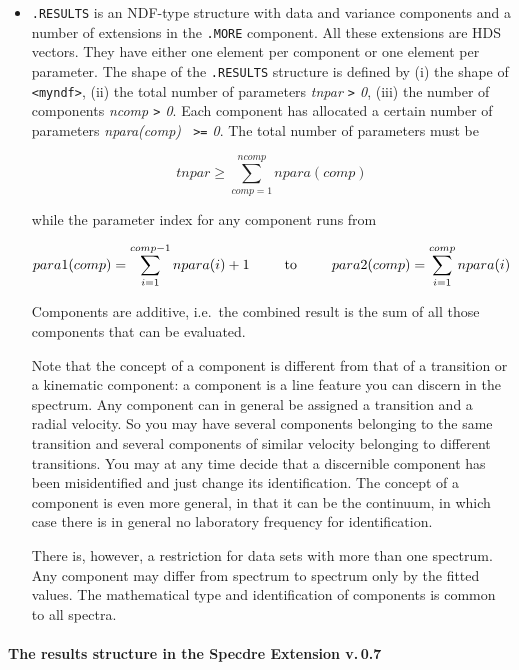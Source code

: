 \begin{itemize}
\item{\tt .RESULTS} is an NDF-type structure with data and variance
   components and a number of extensions in the {\tt .MORE}
   component. All these extensions are HDS vectors. They have either one
   element per component or one element per parameter. The shape of the
   {\tt .RESULTS} structure is defined by (i) the shape of {\tt
   <myndf>}, (ii) the total number of parameters {\it tnpar {\tt>} 0},
   (iii) the number of components {\it ncomp {\tt>} 0}. Each component
   has allocated a certain number of parameters {\it npara(comp) {\tt
   >=} 0}. The total number of parameters must be

   \[tnpar\geq\sum_{comp=1}^{ncomp}npara(comp)\]

   while the parameter index for any component runs from

   \[para1(comp)=\sum_{i=1}^{comp-1}npara(i)+1
   \mbox{\phantom{mmm}to\phantom{mmm}}
   para2(comp)=\sum_{i=1}^{comp}npara(i)\]

   Components are additive, i.e.\ the combined result is the sum of all
   those components that can be evaluated.

   Note that the concept of a component is different from that of a
   transition or a kinematic component: a component is a line feature
   you can discern in the spectrum. Any component can in general be
   assigned a transition and a radial velocity. So you may have several
   components belonging to the same transition and several components of
   similar velocity belonging to different transitions. You may at any
   time decide that a discernible component has been misidentified and
   just change its identification. The concept of a component is even
   more general, in that it can be the continuum, in which case there is
   in general no laboratory frequency for identification.

   There is, however, a restriction for data sets with more than one
   spectrum. Any component may differ from spectrum to spectrum only by
   the fitted values. The mathematical type and identification of
   components is common to all spectra.

\end{itemize}


\paragraph{The results structure in the Specdre Extension v.\,0.7}

